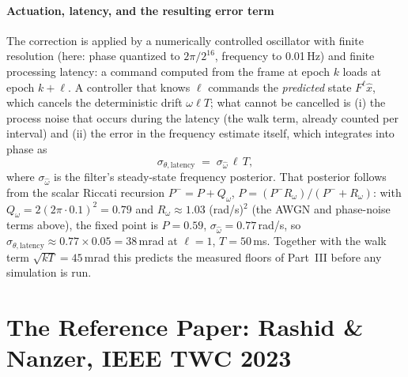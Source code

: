 \documentclass[10pt]{article}
\begin{document}
\subsection{Actuation, latency, and the resulting error term}
The correction is applied by a numerically controlled oscillator with
finite resolution (here: phase quantized to $2\pi/2^{16}$, frequency to
0.01\,Hz) and finite processing latency: a command computed from the
frame at epoch $k$ loads at epoch $k{+}\ell$. A controller that knows
$\ell$ commands the \emph{predicted} state $F^{\ell}\hat x$, which
cancels the deterministic drift $\omega\ell T$; what cannot be cancelled
is (i) the process noise that occurs during the latency (the walk term,
already counted per interval) and (ii) the error in the frequency
estimate itself, which integrates into phase as
\begin{equation}
\sigma_{\theta,\mathrm{latency}}\;=\;\sigma_{\hat\omega}\,\ell\,T ,
\label{eq:latency}
\end{equation}
where $\sigma_{\hat\omega}$ is the filter's steady-state frequency
posterior. That posterior follows from the scalar Riccati recursion
$P^-=P+Q_\omega$, $P=(P^-R_\omega)/(P^-+R_\omega)$: with
$Q_\omega=2(2\pi\cdot0.1)^2=0.79$ and $R_\omega\approx1.03$ (rad/s)$^2$
(the AWGN and phase-noise terms above), the fixed point is $P=0.59$,
$\sigma_{\hat\omega}=0.77$\,rad/s, so
$\sigma_{\theta,\mathrm{latency}}\approx0.77\times0.05=38$\,mrad at
$\ell=1$, $T=50$\,ms. Together with the walk term
$\sqrt{kT}=45$\,mrad this predicts the measured floors of
Part~III before any simulation is run.

\part{The Reference Paper: Rashid \& Nanzer, IEEE TWC 2023}
\end{document}
